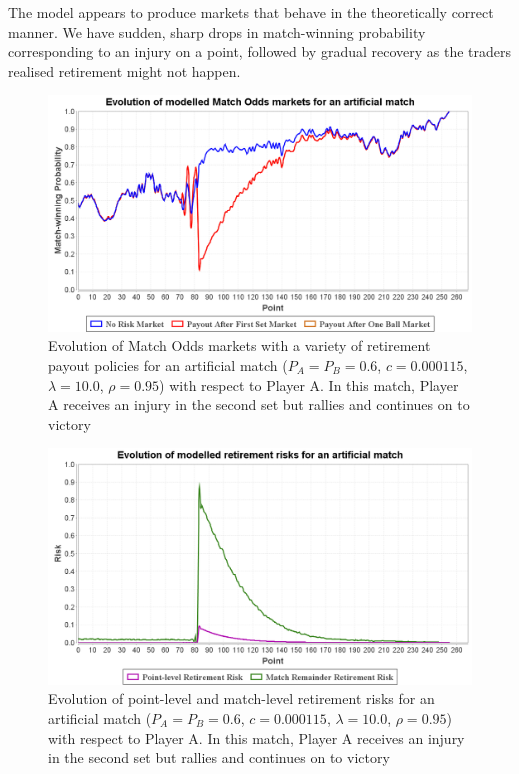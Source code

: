 \documentclass[authoryear, 12pt]{elsarticle}
\begin{document}
The model appears to produce markets that behave in the theoretically correct manner.  We have sudden, sharp drops in match-winning probability corresponding to an injury on a point, followed by gradual recovery as the traders realised retirement might not happen.

\begin{figure}[h!]
\centering \includegraphics[width=12.5cm]{artificialwin}
\caption{Evolution of Match Odds markets with a variety of retirement payout policies for an artificial match ($P_A = P_B = 0.6$, $c = 0.000115$, $\lambda = 10.0$, $\rho = 0.95$) with respect to Player A.  In this match, Player A receives an injury in the second set but rallies and continues on to victory}
\label{artificialwin}
\end{figure}

\begin{figure}[H]
\centering \includegraphics[width=12.5cm]{artificialwinrisk}
\caption{Evolution of point-level and match-level retirement risks for an artificial match ($P_A = P_B = 0.6$, $c = 0.000115$, $\lambda = 10.0$, $\rho = 0.95$) with respect to Player A.  In this match, Player A receives an injury in the second set but rallies and continues on to victory}
\label{artificialwinrisk}
\end{figure}
\end{document}
